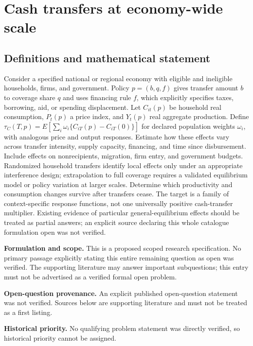 \documentclass[11pt]{article}
\begin{document}
\section*{Cash transfers at economy-wide scale}\label{30007654}
\subsection{Definitions and mathematical statement}
Consider a specified national or regional economy with eligible and ineligible households, firms, and government. Policy \(p=(b,q,f)\) gives transfer amount \(b\) to coverage share \(q\) and uses financing rule \(f\), which explicitly specifies taxes, borrowing, aid, or spending displacement. Let \(C_{it}(p)\) be household real consumption, \(P_t(p)\) a price index, and \(Y_t(p)\) real aggregate production. Define \(\tau_C(T,p)=E[\sum_i\omega_i\{C_{iT}(p)-C_{iT}(0)\}]\) for declared population weights \(\omega_i\), with analogous price and output responses. Estimate how these effects vary across transfer intensity, supply capacity, financing, and time since disbursement. Include effects on nonrecipients, migration, firm entry, and government budgets. Randomized household transfers identify local effects only under an appropriate interference design; extrapolation to full coverage requires a validated equilibrium model or policy variation at larger scales. Determine which productivity and consumption changes survive after transfers cease. The target is a family of context-specific response functions, not one universally positive cash-transfer multiplier. Existing evidence of particular general-equilibrium effects should be treated as partial answers; an explicit source declaring this whole catalogue formulation open was not verified.

\par\textbf{Formulation and scope.} This is a proposed scoped research specification. No primary passage explicitly stating this entire remaining question as open was verified. The supporting literature may answer important subquestions; this entry must not be advertised as a verified formal open problem.

\par\textbf{Open-question provenance.} An explicit published open-question statement was not verified. Sources below are supporting literature and must not be treated as a first listing.

\par\textbf{Historical priority.} No qualifying problem statement was directly verified, so historical priority cannot be assigned.
\end{document}
